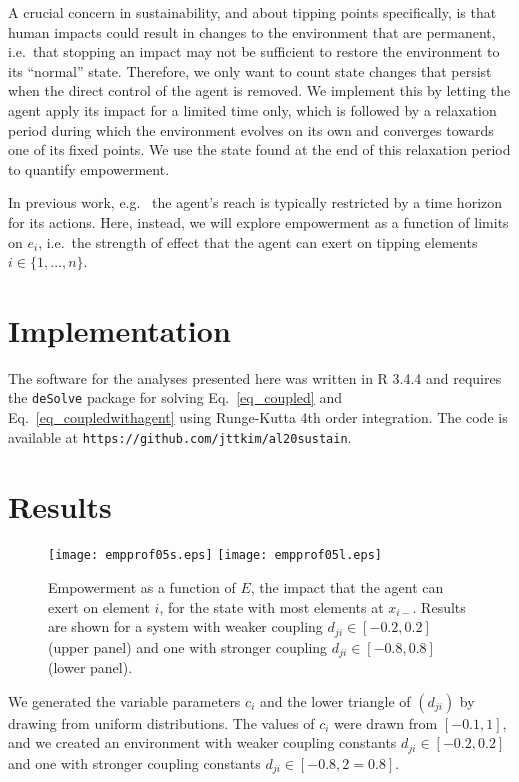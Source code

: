 \documentclass[letterpaper]{article}
\newcommand{\agentimpact}{\ensuremath{e}}
\begin{document}
A crucial concern in sustainability, and about tipping points
specifically, is that human impacts could result in changes to the
environment that are permanent, i.e.\ that stopping an impact may not
be sufficient to restore the environment to its ``normal'' state.
Therefore, we only want to count state changes that persist when the
direct control of the agent is removed. We implement this by letting
the agent apply its impact for a limited time only, which is followed
by a relaxation period during which the environment evolves on its own
and converges towards one of its fixed points. We use the state found
at the end of this relaxation period to quantify empowerment.

In previous work, e.g.\ \cite{Salge2014_empowermentintro} the agent's
reach is typically restricted by a time horizon for its actions. Here,
instead, we will explore empowerment as a function of limits on
$\agentimpact_i$, i.e.\ the strength of effect that the agent can
exert on tipping elements $i \in \{1, \ldots, n\}$.


\section{Implementation}

The software for the analyses presented here was written in R 3.4.4
\citep{RManual2018} and requires the \texttt{deSolve} package for
solving Eq.~\ref{eq_coupled} and
Eq.~\ref{eq_coupledwithagent} using Runge-Kutta 4th order integration.
The code is available at
\texttt{https://github.com/jttkim/al20sustain}.


\section{Results}

\begin{figure}
  \begin{center}
    \texttt{[image: empprof05s.eps]}
    \texttt{[image: empprof05l.eps]}
    \caption{Empowerment as a function of $E$, the impact that the
      agent can exert on element $i$, for the state with most elements
      at $x_{i-}$. Results are shown for a system with weaker coupling
      $d_{ji} \in [-0.2, 0.2]$ (upper panel) and one with stronger
      coupling $d_{ji} \in [-0.8, 0.8]$ (lower panel).}
    \label{fig_empowermentprofiles}
  \end{center}
\end{figure}
We generated the variable parameters $c_i$ and the lower triangle of
$(d_{ji})$ by drawing from uniform distributions. The values of $c_i$
were drawn from $[-0.1, 1]$, and we created an environment with weaker
coupling constants $d_{ji} \in [-0.2, 0.2]$ and one with stronger
coupling constants $d_{ji} \in [-0.8, 2=0.8]$.
\end{document}
